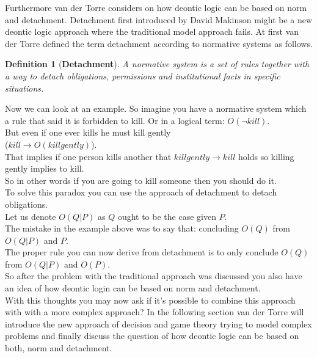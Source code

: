 \documentclass[conference]{hehe}
\newtheorem{definition}{Definition}
\begin{document}
Furthermore van der Torre considers on how deontic logic can be based on norm and detachment. Detachment first introduced by David Makinson might be a new deontic logic approach where the traditional model approach fails. At first van der Torre defined the term detachment according to normative systems as follows.\\
\begin{definition}[\textbf{Detachment}]
A normative system is a set of rules together with
a way to detach obligations, permissions and institutional facts in specific situations. \cite{b2}
\end{definition}

Now we can look at an example. So imagine you have a normative system which a rule that said it is forbidden to kill. Or in a logical term: $O(\lnot kill)$.\\
But even if one ever kills he must kill gently\\
($kill \to O(killgently)$).\\
That implies if one person kills another that $killgently \to kill$ holds so killing gently implies to kill.\\
So in other words if you are going to kill someone then you should do it.\\
To solve this paradox you can use the approach of detachment to detach obligations.\\
Let us denote $O(Q | P)$ as $Q$ ought to be the case given $P$.\\
The mistake in the example above was to say that: concluding $O(Q)$ from $O(Q | P)$ and $P$.\\
The proper rule you can now derive from detachment is to only conclude $O(Q)$ from $O(Q | P)$ and $O(P)$.\\

So after the problem with the traditional approach was discussed you also have an idea of how deontic login can be based on norm and detachment.\\
With this thoughts you may now ask if it's possible to combine this approach with with a more complex approach? In the following section van der Torre will introduce the new approach of decision and game theory trying to model complex problems and finally discuss the question of how deontic logic can be based on both, norm and detachment.
\end{document}
